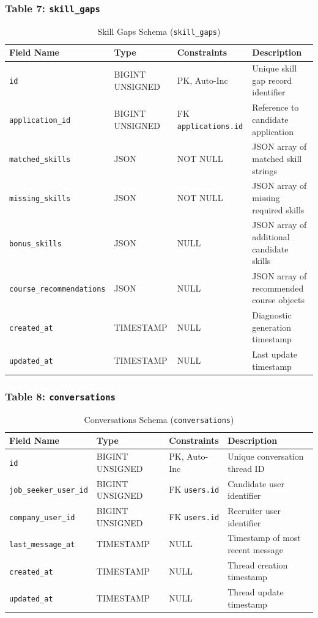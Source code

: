\subsubsection{Table 7: \texttt{skill\_gaps}}
\begin{table}[H]
\centering
\small
\caption{Skill Gaps Schema (\texttt{skill\_gaps})}
\label{tab:schema_skill_gaps}
\begin{tabular}{|p{3cm}|p{2.8cm}|p{2.2cm}|p{5.5cm}|}
\hline
\textbf{Field Name} & \textbf{Type} & \textbf{Constraints} & \textbf{Description} \\ \hline
\texttt{id} & BIGINT UNSIGNED & PK, Auto-Inc & Unique skill gap record identifier \\ \hline
\texttt{application\_id} & BIGINT UNSIGNED & FK \texttt{applications.id}& Reference to candidate application \\ \hline
\texttt{matched\_skills} & JSON & NOT NULL & JSON array of matched skill strings \\ \hline
\texttt{missing\_skills} & JSON & NOT NULL & JSON array of missing required skills \\ \hline
\texttt{bonus\_skills} & JSON & NULL & JSON array of additional candidate skills \\ \hline
\texttt{course\_recommendations}& JSON & NULL & JSON array of recommended course objects \\ \hline
\texttt{created\_at} & TIMESTAMP & NULL & Diagnostic generation timestamp \\ \hline
\texttt{updated\_at} & TIMESTAMP & NULL & Last update timestamp \\ \hline
\end{tabular}
\end{table}

\subsubsection{Table 8: \texttt{conversations}}
\begin{table}[H]
\centering
\small
\caption{Conversations Schema (\texttt{conversations})}
\label{tab:schema_conversations}
\begin{tabular}{|p{3cm}|p{2.8cm}|p{2.2cm}|p{5.5cm}|}
\hline
\textbf{Field Name} & \textbf{Type} & \textbf{Constraints} & \textbf{Description} \\ \hline
\texttt{id} & BIGINT UNSIGNED & PK, Auto-Inc & Unique conversation thread ID \\ \hline
\texttt{job\_seeker\_user\_id}& BIGINT UNSIGNED & FK \texttt{users.id} & Candidate user identifier \\ \hline
\texttt{company\_user\_id} & BIGINT UNSIGNED & FK \texttt{users.id} & Recruiter user identifier \\ \hline
\texttt{last\_message\_at} & TIMESTAMP & NULL & Timestamp of most recent message \\ \hline
\texttt{created\_at} & TIMESTAMP & NULL & Thread creation timestamp \\ \hline
\texttt{updated\_at} & TIMESTAMP & NULL & Thread update timestamp \\ \hline
\end{tabular}
\end{table}


